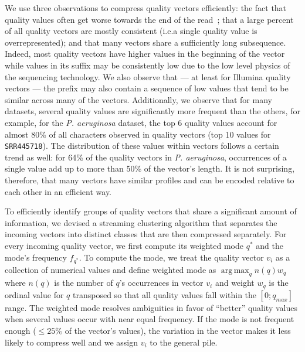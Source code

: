 \documentclass[12pt]{cmuthesis}
\DeclareMathOperator*{\argmax}{arg\,max}
\begin{document}
  We use three observations to compress quality vectors efficiently: the fact that quality values often get worse towards the end of the read~\cite{SeqSqueeze}; that a large percent of all quality vectors are mostly consistent (i.e.\@ a single quality value is overrepresented); and that many vectors share a sufficiently long subsequence. Indeed, most quality vectors have higher values in the beginning of the vector while values in its suffix may be consistently low due to the low level physics of the sequencing technology. We also observe that --- at least for Illumina quality vectors --- the prefix may also contain a sequence of low values that tend to be similar across many of the vectors.  Additionally, we observe that for many datasets, several quality values are significantly more frequent than the others, for example, for the \textit{P. aeruginosa} dataset, the top 6 quality values account for almost 80\% of all characters observed in quality vectors (top 10 values for \texttt{SRR445718}). The distribution of these values within vectors follows a certain trend as well: for 64\% of the quality vectors in \textit{P. aeruginosa}, occurrences of a single value add up to more than 50\% of the vector's length. It is not surprising, therefore, that many vectors have similar profiles and can be encoded relative to each other in an efficient way.



  To efficiently identify groups of quality vectors that share a significant amount of information, we devised a streaming clustering algorithm that separates the incoming vectors into distinct classes that are then compressed separately. For every incoming quality vector, we first compute its weighted mode $q^{*}$ and the mode's frequency $f_{q^{*}}$. To compute the mode, we treat the quality vector $v_i$ as a collection of numerical values and define weighted mode as $\argmax_q n(q) w_q$ where $n(q)$ is the number of $q$'s occurrences in vector $v_i$ and weight $w_q$ is the ordinal value for $q$ transposed so that all quality values fall within the $[0;q_{max}]$ range. The weighted mode resolves ambiguities in favor of ``better'' quality values when several values occur with near equal frequency. If the mode is not frequent enough ($\le 25\%$ of the vector's values), the variation in the vector makes it less likely to compress well and we assign $v_i$ to the general pile.
\end{document}
